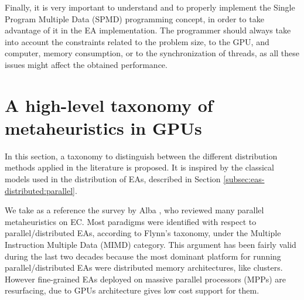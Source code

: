 \documentclass{article}
\begin{document}
Finally, it is very important to understand and to properly implement
the Single Program Multiple Data (SPMD)\cite{SPMD-wikipedia} programming
concept, in order to take advantage of it in the EA implementation. The programmer should always take into account the constraints related to the problem size, to the GPU, and computer, memory consumption, or to the synchronization of threads, as all these issues might affect the obtained performance.


\section{A high-level taxonomy of metaheuristics in GPUs}
\label{sec:taxonomy}

In this section, a taxonomy to distinguish between the different
distribution methods applied in the literature is proposed.
It is inspired by the classical models used in the distribution of EAs, described in Section \ref{subsec:eas-distributed:parallel}.

We take as a reference the survey by Alba \cite{Alba2005book}, who reviewed many parallel metaheuristics on EC. Most paradigms were identified with respect to
parallel/distributed EAs, according to Flynn's taxonomy, under the
Multiple Instruction Multiple Data (MIMD) category. This argument has
been fairly valid during the last two decades because the most
dominant platform for running parallel/distributed EAs were
distributed memory architectures, like clusters. However fine-grained
EAs deployed on massive parallel processors (MPPs) are resurfacing,
due to GPUs architecture gives low cost support for them.
\end{document}
